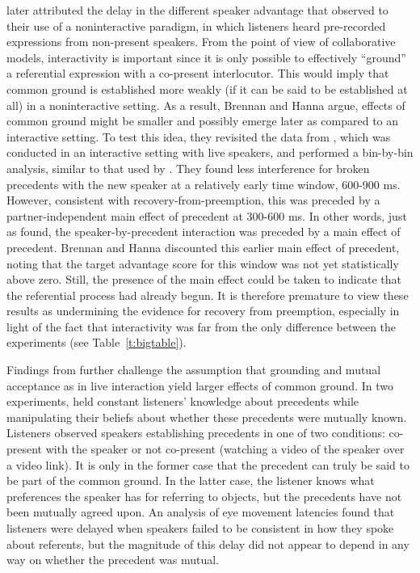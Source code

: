 \documentclass[doc,fignum,apacite,floatsintext]{apa6}
\begin{document}
 later attributed the delay in the different speaker advantage that  observed to their use of a noninteractive paradigm, in which listeners heard pre-recorded expressions from non-present speakers.  From the point of view of collaborative models, interactivity is important since it is only possible to effectively ``ground'' a referential expression with a co-present interlocutor.  This would imply that common ground is established more weakly (if it can be said to be established at all) in a noninteractive setting.  As a result, Brennan and Hanna argue, effects of common ground might be smaller and possibly emerge later as compared to an interactive setting.  To test this idea, they revisited the data from , which was conducted in an interactive setting with live speakers, and performed a bin-by-bin analysis, similar to that used by \citeauthor{kronmullerbarr07}.  They found less interference for broken precedents with the new speaker at a relatively early time window, 600-900 ms.  However, consistent with recovery-from-preemption, this was preceded by a partner-independent main effect of precedent at 300-600 ms.  In other words, just as  found, the speaker-by-precedent interaction was preceded by a main effect of precedent.  Brennan and Hanna discounted this earlier main effect of precedent, noting that the target advantage score for this window was not yet statistically above zero.  Still, the presence of the main effect could be taken to indicate that the referential process had already begun.  It is therefore premature to view these results as undermining the evidence for recovery from preemption, especially in light of the fact that interactivity was far from the only difference between the experiments (see Table~\ref{t:bigtable}).

Findings from  further challenge the assumption that grounding and mutual acceptance as in live interaction yield larger effects of common ground.  In two experiments, \citeauthor{shintelkeysar07} held constant listeners' knowledge about precedents while manipulating their beliefs about whether these precedents were mutually known.  Listeners observed speakers establishing precedents in one of two conditions: co-present with the speaker or not co-present (watching a video of the speaker over a video link).  It is only in the former case that the precedent can truly be said to be part of the common ground.  In the latter case, the listener knows what preferences the speaker has for referring to objects, but the precedents have not been mutually agreed upon.  An analysis of eye movement latencies found that listeners were delayed when speakers failed to be consistent in how they spoke about referents, but the magnitude of this delay did not appear to depend in any way on whether the precedent was mutual.  
\end{document}
